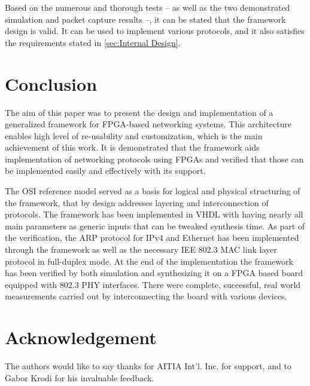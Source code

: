 \documentclass[conference]{IEEEtran}
\begin{document}
Based on the numerous and thorough tests -- as well as the two demonstrated simulation and packet capture results --,
it can be stated that the framework design is valid. It can be used to implement various protocols, and it also
satisfies the requirements stated in \ref{sec:Internal Design}.

\section{Conclusion}

The aim of this paper was to present the design and implementation of a generalized framework for FPGA-based networking
systems. This architecture enables high level of re-usability and customization, which is the main achievement of this
work. It is demonstrated that the framework aids implementation of networking protocols using FPGAs and verified that
those can be implemented easily and effectively with its support.

The OSI reference model served as a basis for logical and physical structuring of the framework, that by design
addresses layering and interconnection of protocols. The framework has been implemented in VHDL with having nearly all
main parameters as generic inputs that can be tweaked synthesis time. As part of the verification, the ARP protocol for
IPv4 and Ethernet has been implemented through the framework as well as the  necessary IEE 802.3 MAC link layer
protocol in full-duplex mode.
At the end of the implementation the framework has been verified by both simulation and synthesizing it on a FPGA based
board equipped with 802.3 PHY interfaces. There were complete,  successful, real world measurements carried out by
interconnecting the board with various devices.

\section*{Acknowledgement}
The authors would like to say thanks for AITIA Int’l. Inc. for support, and to Gabor Krodi for his invaluable feedback.





%

%
%
\end{document}
